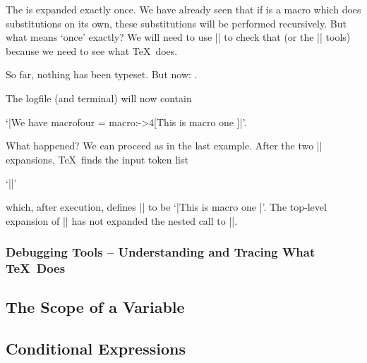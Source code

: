 \begin{command}{\expandafter{}}
	The  is expanded exactly once. We have already seen that if  is a macro which does substitutions on its own, these substitutions will be performed recursively. But what means `once' exactly? We will need to use |\meaning| to check that (or the |\tracingmacros| tools) because we need to see what \TeX\ does.
\begin{codeexample}[]
\def\macroone{This is macro one \macrotwo}
\def\macrotwo{--2--}
\def\macrothree#1{\def\macrofour{4[#1]}}
\expandafter\macrothree\expandafter{\macroone}%
So far, nothing has been typeset. But now: \macrofour.
%
\end{codeexample}
	The logfile (and terminal) will now contain

	`|We have macrofour = macro:->4[This is macro one \macrotwo ]|'.

	What happened? We can proceed as in the last example. After the two |\expandafter| expansions, \TeX\ finds the input token list

	`||'

	which, after execution, defines |\macrofour| to be `|This is macro one \macrotwo|'. The top-level expansion of |\macroone| has not expanded the nested call to |\macrotwo|.
\end{command}

\subsubsection{Debugging Tools -- Understanding and Tracing What \TeX\ Does}
\begin{command}{\meaning{}}
\end{command}
\begin{command}{}
\end{command}
\begin{command}{}
\end{command}
\begin{command}{}
\end{command}

\subsection{The Scope of a Variable}


\subsection{Conditional Expressions}

